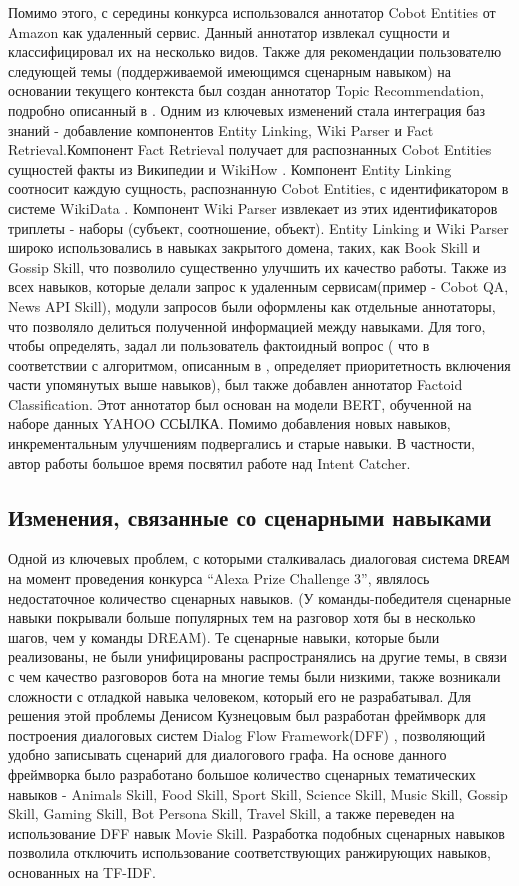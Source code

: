 Помимо этого, с середины конкурса использовался аннотатор Cobot Entities от Amazon как удаленный сервис. Данный аннотатор извлекал сущности и классифицировал их на несколько видов.
Также для рекомендации пользователю следующей темы (поддерживаемой имеющимся сценарным навыком) на основании текущего контекста был создан аннотатор Topic Recommendation, подробно описанный в \cite{dream2}.
Одним из ключевых изменений стала интеграция баз знаний - добавление компонентов Entity Linking, Wiki Parser и Fact Retrieval.Компонент Fact Retrieval получает для распознанных Cobot Entities сущностей факты из Википедии и WikiHow \cite{wikihow}.  Компонент Entity Linking соотносит каждую сущность, распознанную Cobot Entities, с идентификатором в системе WikiData \cite{vrandei_2014}. Компонент Wiki Parser извлекает из этих идентификаторов триплеты - наборы (субъект, соотношение, объект). Entity Linking и Wiki Parser широко использовались в навыках закрытого домена, таких, как Book Skill и Gossip Skill, что позволило существенно улучшить их качество работы.
Также из всех навыков, которые делали запрос к удаленным сервисам(пример -  Cobot QA, News API Skill), модули запросов были оформлены как отдельные аннотаторы, что позволяло делиться полученной информацией между навыками.
Для того, чтобы определять, задал ли пользователь фактоидный вопрос ( что в соответствии с алгоритмом, описанным в \cite{dream2}, определяет приоритетность включения части упомянутых выше навыков), был также добавлен аннотатор Factoid Classification. Этот аннотатор был основан на модели BERT, обученной на наборе данных YAHOO ССЫЛКА.
Помимо добавления новых навыков, инкрементальным улучшениям подвергались и старые навыки. В частности, автор работы большое время посвятил работе над Intent Catcher. 

\subsection{Изменения, связанные со сценарными навыками}
Одной из ключевых проблем, с которыми сталкивалась диалоговая система \texttt{DREAM} на момент проведения конкурса “Alexa Prize Challenge 3”, являлось недостаточное количество сценарных навыков. (У команды-победителя сценарные навыки покрывали больше популярных тем на разговор хотя бы в несколько шагов, чем у команды DREAM). Те сценарные навыки, которые были реализованы, не были унифицированы распространялись на другие темы, в связи с чем качество разговоров бота на многие темы были низкими, также возникали сложности с отладкой навыка человеком, который его не разрабатывал. Для решения этой проблемы Денисом Кузнецовым был разработан фреймворк для построения диалоговых систем Dialog Flow Framework(DFF) \cite{dff}, позволяющий удобно записывать сценарий для диалогового графа. На основе данного фреймворка было разработано большое количество сценарных тематических навыков - Animals Skill, Food Skill, Sport Skill, Science Skill, Music Skill, Gossip Skill, Gaming Skill, Bot Persona Skill, Travel Skill, а также переведен на использование DFF навык Movie Skill. Разработка подобных сценарных навыков позволила отключить использование соответствующих ранжирующих навыков, основанных на TF-IDF.


